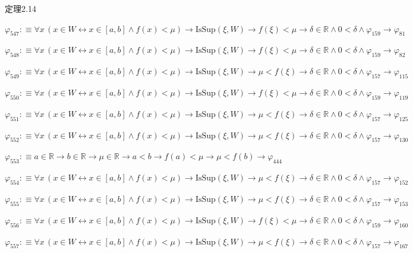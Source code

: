 \begin{fullproof}{定理2.14}
\begin{abbrevlist}
\item $\varphi_{547} :\equiv \forall x\,(x \in W \leftrightarrow x \in [a,b] \land f(x) < \mu) \to \mathrm{IsSup}(\xi,W) \to f(\xi) < \mu \to \delta \in \mathbb{R} \land 0 < \delta \land \varphi_{159} \to \varphi_{81}$
\item $\varphi_{548} :\equiv \forall x\,(x \in W \leftrightarrow x \in [a,b] \land f(x) < \mu) \to \mathrm{IsSup}(\xi,W) \to f(\xi) < \mu \to \delta \in \mathbb{R} \land 0 < \delta \land \varphi_{159} \to \varphi_{82}$
\item $\varphi_{549} :\equiv \forall x\,(x \in W \leftrightarrow x \in [a,b] \land f(x) < \mu) \to \mathrm{IsSup}(\xi,W) \to \mu < f(\xi) \to \delta \in \mathbb{R} \land 0 < \delta \land \varphi_{157} \to \varphi_{115}$
\item $\varphi_{550} :\equiv \forall x\,(x \in W \leftrightarrow x \in [a,b] \land f(x) < \mu) \to \mathrm{IsSup}(\xi,W) \to f(\xi) < \mu \to \delta \in \mathbb{R} \land 0 < \delta \land \varphi_{159} \to \varphi_{119}$
\item $\varphi_{551} :\equiv \forall x\,(x \in W \leftrightarrow x \in [a,b] \land f(x) < \mu) \to \mathrm{IsSup}(\xi,W) \to \mu < f(\xi) \to \delta \in \mathbb{R} \land 0 < \delta \land \varphi_{157} \to \varphi_{125}$
\item $\varphi_{552} :\equiv \forall x\,(x \in W \leftrightarrow x \in [a,b] \land f(x) < \mu) \to \mathrm{IsSup}(\xi,W) \to \mu < f(\xi) \to \delta \in \mathbb{R} \land 0 < \delta \land \varphi_{157} \to \varphi_{130}$
\item $\varphi_{553} :\equiv a \in \mathbb{R} \to b \in \mathbb{R} \to \mu \in \mathbb{R} \to a < b \to f(a) < \mu \to \mu < f(b) \to \varphi_{444}$
\item $\varphi_{554} :\equiv \forall x\,(x \in W \leftrightarrow x \in [a,b] \land f(x) < \mu) \to \mathrm{IsSup}(\xi,W) \to \mu < f(\xi) \to \delta \in \mathbb{R} \land 0 < \delta \land \varphi_{157} \to \varphi_{152}$
\item $\varphi_{555} :\equiv \forall x\,(x \in W \leftrightarrow x \in [a,b] \land f(x) < \mu) \to \mathrm{IsSup}(\xi,W) \to \mu < f(\xi) \to \delta \in \mathbb{R} \land 0 < \delta \land \varphi_{157} \to \varphi_{153}$
\item $\varphi_{556} :\equiv \forall x\,(x \in W \leftrightarrow x \in [a,b] \land f(x) < \mu) \to \mathrm{IsSup}(\xi,W) \to f(\xi) < \mu \to \delta \in \mathbb{R} \land 0 < \delta \land \varphi_{159} \to \varphi_{160}$
\item $\varphi_{557} :\equiv \forall x\,(x \in W \leftrightarrow x \in [a,b] \land f(x) < \mu) \to \mathrm{IsSup}(\xi,W) \to \mu < f(\xi) \to \delta \in \mathbb{R} \land 0 < \delta \land \varphi_{157} \to \varphi_{167}$

\end{abbrevlist}
\end{fullproof}
